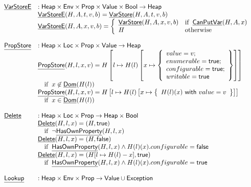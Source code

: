 \[\begin{array}{ll}
\chf{VarStoreE} & : \SF{Heap} \times \SF{Env} \times \SF{Prop} \times \SF{Value}
\times \SF{Bool} \rightarrow \SF{Heap} \\
& \chf{VarStoreE}(H,A, t, v, b) = \chf{VarStore}(H,A, t, v, b) \\
& \chf{VarStoreE}(H,A, x, v, b) = \left\{
  \begin{array}{ll}
    \chf{VarStore}(H,A, x, v, b) &\ifc{\chf{CanPutVar}(H,A,x)}\\
    H & \owc
  \end{array}
\right. \\\\

\chf{PropStore} & : \SF{Heap} \times \SF{Loc} \times \SF{Prop} \times \SF{Value} \rightarrow \SF{Heap} \\
& \chf{PropStore}(H,l,x,v)
  = H\left[l\mapsto H(l)\left[x\mapsto \set{
    value=v;\\
   enumerable=\vtrue;\\
    configurable=\vtrue;\\
    writable=\vtrue
 }\right]\right]\\
& \quad\ifc{x\not\in \chf{Dom}(H(l))} \\
& \chf{PropStore}(H,l,x,v)
  = H\left[l\mapsto H(l)\left[x\mapsto \set{H(l)(x)\rwith value=v}\right]\right]\\
& \quad\ifc{x\in \chf{Dom}(H(l))} \\

\\
\chf{Delete} & : \SF{Heap} \times \SF{Loc} \times \SF{Prop} \rightarrow \SF{Heap}
\times \SF{Bool}\\
& \chf{Delete}(H,l,x)
  =  (H,\vtrue)\\
& \quad\ifc{\lnot\chf{HasOwnProperty}(H,l,x)} \\
& \chf{Delete}(H,l,x)
  =  (H,\vfalse)\\
& \quad\ifc{\chf{HasOwnProperty}(H,l,x)\land
    H(l)(x).configurable = \vfalse} \\
& \chf{Delete}(H,l,x)
  =  (H[l\mapsto H(l) - x],\vtrue)\\
& \quad\ifc{\chf{HasOwnProperty}(H,l,x) \land H(l)(x).configurable = \vtrue} \\\\

\chf{Lookup} & : \SF{Heap} \times \SF{Env} \times \SF{Prop} \rightarrow \SF{Value} \cup \SF{Exception}\\

&
\begin{array}{ll}


\end{array}
\end{array}\]
